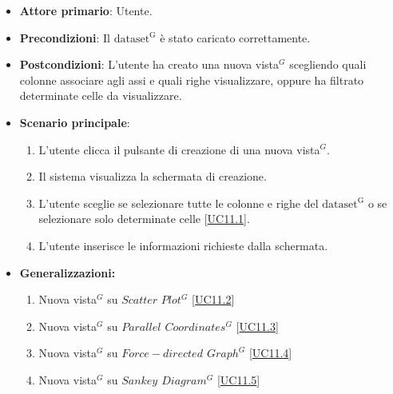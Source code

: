 \begin{itemize}
    \item \textbf{Attore primario}: Utente.
    \item \textbf{Precondizioni}: Il ${\mathrm{dataset^{G}}}$ è stato caricato correttamente.
    \item \textbf{Postcondizioni}: L'utente ha creato una nuova vista$^{G}$ scegliendo quali colonne associare agli assi e quali righe visualizzare, oppure ha filtrato determinate celle da visualizzare.
    \item \textbf{Scenario principale}:
          \begin{enumerate}
              \item L'utente clicca il pulsante di creazione di una nuova vista$^{G}$.
              \item Il sistema visualizza la schermata di creazione.
              \item L'utente sceglie se selezionare tutte le colonne e righe del ${\mathrm{dataset^{G}}}$ o se selezionare solo determinate celle [\hyperref[sec:UC11.1]{UC11.1}].
              \item L'utente inserisce le informazioni richieste dalla schermata.
          \end{enumerate}
  \item \textbf{Generalizzazioni:} \begin{enumerate}
                                        \item Nuova vista$^{G}$ su $Scatter$ $Plot^{G}$ [\hyperref[sec:UC11.2]{UC11.2}]
                                        \item Nuova vista$^{G}$ su \textit{$Parallel$ $Coordinates^{G}$} [\hyperref[sec:UC11.3]{UC11.3}]
                                        \item Nuova vista$^{G}$ su \textit{$Force-directed$ $Graph^{G}$} [\hyperref[sec:UC11.4]{UC11.4}]
                                        \item Nuova vista$^{G}$ su \textit{$Sankey$ $Diagram^{G}$} [\hyperref[sec:UC11.5]{UC11.5}]
                                    \end{enumerate}
\end{itemize}


